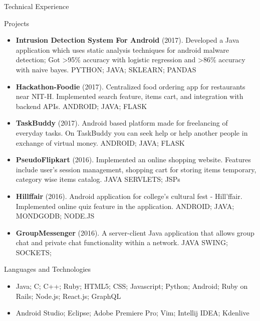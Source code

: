 \documentclass[]{mcdowellcv}
\begin{document}
	\begin{cvsection}{Technical Experience}
		\begin{cvsubsection}{Projects}{}{}
			\begin{itemize}
				\item \textbf{Intrusion Detection System For Android} (2017). Developed a Java application which uses static analysis techniques for android malware detection; Got >95\% accuracy with logistic regression and >86\% accuracy with naive bayes. PYTHON; JAVA; SKLEARN; PANDAS
				\item \textbf{Hackathon-Foodie } (2017). Centralized food ordering app for restaurants near NIT-H. Implemented search feature, items cart, and integration with backend APIs. ANDROID; JAVA; FLASK
				\item \textbf{TaskBuddy } (2017). Android based platform made for freelancing of everyday tasks. On TaskBuddy you can seek help or help another people in exchange of virtual money. ANDROID; JAVA; FLASK	
				\item \textbf{PseudoFlipkart} (2016). Implemented an online shopping website. Features include user’s session management, shopping cart for storing items temporary, category wise items catalog. JAVA SERVLETS; JSPs
				\item \textbf{Hillffair} (2016). Android application for college’s cultural fest - Hill’ffair. Implemented online quiz feature in the application. ANDROID; JAVA; MONDGODB; NODE.JS
				\item \textbf{GroupMessenger} (2016). A server-client Java application that allows group chat and private chat functionality within a network. JAVA SWING; SOCKETS;
			\end{itemize}
		\end{cvsubsection}
	\end{cvsection}

	\begin{cvsection}{Languages and Technologies}
		\begin{cvsubsection}{}{}{}	
			\begin{itemize}
				\item Java; C; C++; Ruby; HTML5; CSS; Javascript; Python; Android; Ruby on Rails; Node.js; React.js; GraphQL
				\item Android Studio; Eclipse; Adobe Premiere Pro; Vim; Intellij IDEA; Kdenlive
			\end{itemize}
		\end{cvsubsection}
	\end{cvsection}
	
\end{document}
